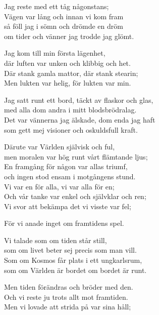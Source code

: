\vspace{10pt}
Jag reste med ett tåg någonstans;\\
Vägen var lång och innan vi kom fram\\
så föll jag i sömn och drömde en dröm\\
om tider och vänner jag trodde jag glömt.\par
\vspace{10pt}
Jag kom till min första lägenhet,\\
där luften var unken och klibbig och het.\\
Där stank gamla mattor, där stank stearin;\\
Men lukten var helig, för lukten var min.\par
\vspace{10pt}
Jag satt runt ett bord, täckt av flaskor och glas,\\
med alla dom andra i mitt blodsbrödralag.\\
Det var vännerna jag älskade, dom enda jag haft\\
som gett mej visioner och oskuldsfull kraft.\par
\vspace{10pt}
Därute var Världen självisk och ful,\\
men moralen var hög runt vårt flämtande ljus;\\
En framgång för någon var allas triumf,\\
och ingen stod ensam i motgångens stund.\\
Vi var en för alla, vi var alla för en;\\
Och vår tanke var enkel och självklar och ren;\\
Vi svor att bekämpa det vi visste var fel;\par
\vspace{10pt}
För vi anade inget om framtidens spel.\par
\newpage
Vi talade som om tiden står still,\\
som om livet beter sej precis som man vill.\\
Som om Kosmos får plats i ett ungkarlsrum,\\
som om Världen är bordet om bordet är runt.\par
\vspace{10pt}
Men tiden förändras och bröder med den.\\
Och vi reste ju trots allt mot framtiden.\\
Men vi lovade att strida på var sina håll;\\
